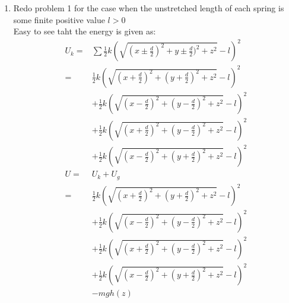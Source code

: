 \documentclass{article}
\begin{document}
\begin{enumerate}
\[\begin{aligned}
    A\frac{d}{4} &= \beta_1\\
    0 &= \gamma_1
    \end{aligned}
    \right. 
    \]
    Easy to see 
    \[
    \left\{
    \begin{aligned}
    \alpha_1 &= 0\\
    \alpha_2 &= \frac{d}{2}\\
    \beta_1 &= A\frac{d}{4}\\
    \beta_2 &= 0\\
    \gamma_1 &= 0\\
    \gamma_2 &= \frac{gm}{4k}
    \end{aligned}
    \right. 
    \]
    Thus we have the answer as
    \[
    \left\{
    \begin{aligned}
    x &= \frac{d}{2} \cos(2\sqrt{\frac{k}{m}}t)\\
    y &= A\frac{d}{4} \sin(2\sqrt{\frac{k}{m}}t)\\
    z &= \frac{gm}{4k}\cos(2\sqrt{\frac{k}{m}}t) - \frac{gm}{4k}
    \end{aligned}
    \right. 
    \] 

    To make the motion a circle, we want the constants term is same for $x$ and $y$, i.e., $\frac{d}{2} = A\frac{d}{4}$. Thus, we have $A = 2$.

    \item Redo problem 1 for the case when the unstretched length of each spring is some finite positive value $l > 0$ \\

    Easy to see taht the energy is given as:
    \begin{align*}
        U_k =& \sum \frac{1}{2}k(\sqrt{(x\pm \frac{d}{2})^2 + y\pm \frac{d}{2})^2 + z^2}-l)^2 \\
          =& \frac{1}{2}k(\sqrt{(x + \frac{d}{2})^2 + (y + \frac{d}{2})^2 + z^2}-l)^2 \\
           &+\frac{1}{2}k(\sqrt{(x - \frac{d}{2})^2 + (y - \frac{d}{2})^2 + z^2}-l)^2 \\
           &+\frac{1}{2}k(\sqrt{(x + \frac{d}{2})^2 + (y - \frac{d}{2})^2 + z^2}-l)^2 \\
           &+\frac{1}{2}k(\sqrt{(x - \frac{d}{2})^2 + (y + \frac{d}{2})^2 + z^2}-l)^2 \\
        U =& U_k + U_g \\
          =& \frac{1}{2}k(\sqrt{(x + \frac{d}{2})^2 + (y + \frac{d}{2})^2 + z^2}-l)^2 \\
           &+\frac{1}{2}k(\sqrt{(x - \frac{d}{2})^2 + (y - \frac{d}{2})^2 + z^2}-l)^2 \\
           &+\frac{1}{2}k(\sqrt{(x + \frac{d}{2})^2 + (y - \frac{d}{2})^2 + z^2}-l)^2 \\
           &+\frac{1}{2}k(\sqrt{(x - \frac{d}{2})^2 + (y + \frac{d}{2})^2 + z^2}-l)^2 \\
           &-mgh(z)
    \end{align*}


\end{enumerate}
\end{document}
